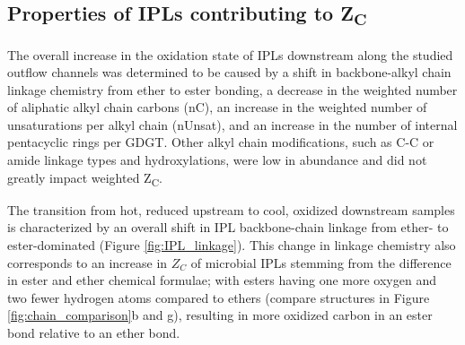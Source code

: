 \subsection{Properties of IPLs contributing to Z\textsubscript{C}}
The overall increase in the oxidation state of IPLs downstream along the studied outflow channels was determined to be caused by a shift in backbone-alkyl chain linkage chemistry from ether to ester bonding, a decrease in the weighted number of aliphatic alkyl chain carbons (nC), an increase in the weighted number of unsaturations per alkyl chain (nUnsat), and an increase in the number of internal pentacyclic rings per GDGT. Other alkyl chain modifications, such as C-C or amide linkage types and hydroxylations, were low in abundance and did not greatly impact weighted Z\textsubscript{C}.

The transition from hot, reduced upstream to cool, oxidized downstream samples is characterized by an overall shift in IPL backbone-chain linkage from ether- to ester-dominated (Figure \ref{fig:IPL_linkage}). This change in linkage chemistry also corresponds to an increase in $Z_{C}$ of microbial IPLs stemming from the difference in ester and ether chemical formulae; with esters having one more oxygen and two fewer hydrogen atoms compared to ethers (compare structures in Figure \ref{fig:chain_comparison}b and g), resulting in more oxidized carbon in an ester bond relative to an ether bond.





